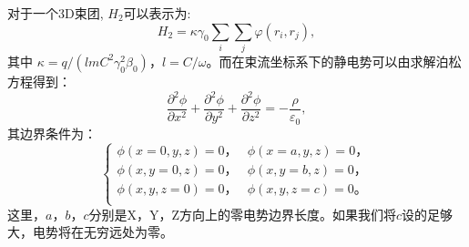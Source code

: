 {对于一个3D束团, ${{H}_{2}}$可以表示为:
\begin{equation}
{{H}_{2}}=\kappa {{\gamma }_{0}}\sum\limits_{i}{\sum\limits_{j}{\varphi ({{r}_{i}},{{r}_{j}})}},
\end{equation}
其中 $\kappa =q/(lm{{C}^{2}}\gamma _{0}^{2}{{\beta }_{0}})$，$l=C/\omega $。而在束流坐标系下的静电势可以由求解泊松方程得到：
\begin{equation}
\frac{{{\partial }^{2}}\phi }{\partial {{x}^{2}}}+\frac{{{\partial }^{2}}\phi }{\partial {{y}^{2}}}+\frac{{{\partial }^{2}}\phi }{\partial {{z}^{2}}}=-\frac{\rho }{{{\varepsilon }_{0}}},
\end{equation}
其边界条件为：
\begin{equation}
\left\{
\begin{array}{cc}
   \phi (x=0,y,z)=0 \text{，} & \phi (x=a,y,z)=0 \text{，} \\
   \phi (x,y=0,z)=0 \text{，} & \phi (x,y=b,z)=0 \text{，}  \\
   \phi (x,y,z=0)=0 \text{，} & \phi (x,y,z=c)=0 \text{。}  \\
\end{array}
\right.
\end{equation}
这里，$a$，$b$，$c$分别是X，Y，Z方向上的零电势边界长度。如果我们将$c$设的足够大，电势将在无穷远处为零。

}
